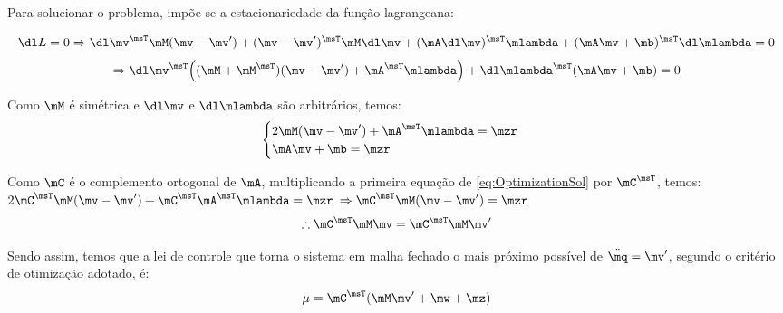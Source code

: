 Para solucionar o problema, imp\~oe-se a estacionariedade da fun\c{c}\~ao lagrangeana:

$$ \dl L = 0 \Rightarrow \dl \mv^\msT \mM (\mv - \mv') + (\mv - \mv')^\msT \mM \dl \mv + (\mA \dl \mv)^\msT \mlambda + (\mA \mv + \mb)^\msT \dl \mlambda = 0 $$
$$ \Rightarrow \dl \mv^\msT \Big( (\mM + \mM^\msT)(\mv - \mv') + \mA^\msT \mlambda \Big) + \dl \mlambda^\msT (\mA \mv + \mb) = 0 $$

Como $\mM$ \'e sim\'etrica e $\dl \mv$ e $\dl \mlambda$ s\~ao arbitr\'arios, temos:
\begin{equation} \label{eq:OptimizationSol}
\begin{cases}
2 \mM (\mv - \mv') + \mA^\msT \mlambda = \mzr \\
\mA \mv + \mb = \mzr
\end{cases}
\end{equation}

Como $\mC$ \'e o complemento ortogonal de $\mA$, multiplicando a primeira equa\c{c}\~ao de \eqref{eq:OptimizationSol} por $\mC^\msT$, temos: \\

$ 2 \mC^\msT \mM (\mv - \mv') + \mC^\msT \mA^\msT \mlambda = \mzr $
$ \Rightarrow  \mC^\msT \mM (\mv - \mv')  = \mzr $
\begin{equation} \label{eq:OptimizationSol2}
\therefore \mC^\msT \mM \mv  = \mC^\msT \mM  \mv'
\end{equation}

Sendo assim, temos que a lei de controle que torna o sistema em malha fechado o mais pr\'oximo poss\'ivel de $\ddot{\mq} = \mv'$, segundo o crit\'erio de otimiza\c{c}\~ao adotado, \'e:
\begin{equation} \label{eq:ControlLawFinal}
\mu = \mC^\msT ( \mM \mv' + \mw + \mz )
\end{equation}